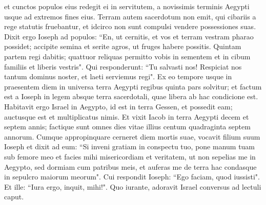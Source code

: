 \begin{biblechapter}
\verse et cunctos populos eius redegit ei in servitutem, a novissimis terminis Aegypti usque ad extremos fines eius. 
\verse Terram autem sacerdotum non emit, qui cibariis a rege statutis fruebantur, et idcirco non sunt compulsi vendere possessiones suas. 
\verse Dixit ergo Ioseph ad populos: “En, ut cernitis, et vos et terram vestram pharao possidet; accipite semina et serite agros, 
\verse ut fruges habere possitis. Quintam partem regi dabitis; quattuor reliquas permitto vobis in sementem et in cibum familiis et liberis vestris". 
\verse Qui responderunt: “Tu salvasti nos! Respiciat nos tantum dominus noster, et laeti serviemus regi". 
\verse Ex eo tempore usque in praesentem diem in universa terra Aegypti regibus quinta pars solvitur; et factum est a Ioseph in legem absque terra sacerdotali, quae libera ab hac condicione est. 
\verse Habitavit ergo Israel in Aegypto, id est in terra Gessen, et possedit eam; auctusque est et multiplicatus nimis. 
\verse Et vixit Iacob in terra Aegypti decem et septem annis; factique sunt omnes dies vitae illius centum quadraginta septem annorum. 
\verse Cumque appropinquare cerneret diem mortis suae, vocavit filium suum Ioseph et dixit ad eum: “Si inveni gratiam in conspectu tuo, pone manum tuam sub femore meo et facies mihi misericordiam et veritatem, ut non sepelias me in Aegypto,  
\verse sed dormiam cum patribus meis, et auferas me de terra hac condasque in sepulcro maiorum meorum". Cui respondit Ioseph: “Ego faciam, quod iussisti".  
\verse Et ille: “Iura ergo, inquit, mihi!". Quo iurante, adoravit Israel conversus ad lectuli caput. 
\end{biblechapter}


